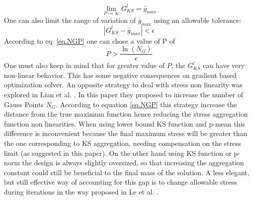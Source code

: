 \begin{equation}
\lim\limits_{P\rightarrow \infty}G^{l}_{KS}=\bar{g}_{max}
\end{equation}
One can also limit the range of variation of $\bar{g}_{max}$ using an allowable tolerance: 
\begin{equation}
\left|G^{l}_{KS}-\bar{g}_{max}\right|<\epsilon 
\end{equation}
According to eq. \ref{eq.NGP} one can chose a value of P of
\begin{equation}
  P>\frac{\ln\left(N_G\right)}{\epsilon} 
\end{equation}
One must also keep in mind that for greater value of $P$, the $G_{KS}^l$ can have very non-linear behavior. This has some negative consequences on gradient based optimization solver. An opposite strategy to deal with stress non linearity was explored in Lian et al. \cite{lian2017combined}. In this paper they proposed to increase the number of Gauss Points $N_G$. According to equation \ref{eq.NGP} this strategy increase the distance from the true maximum function hence reducing the stress aggregation function non linearities. When using lower bound KS function and p-mean this difference is inconvenient because the final maximum stress will be greater than the one  corresponding to KS aggregation, needing compensation on the stress limit (as suggested in this paper). On the other hand using KS function or p-norm the design is always slightly oversized, so that increasing the aggregation constant could still be beneficial to the final mass of the solution. A less elegant, but still effective way of accounting for this gap is to change allowable stress during iterations in the way proposed in Le et al. \cite{le2010stress}.   
